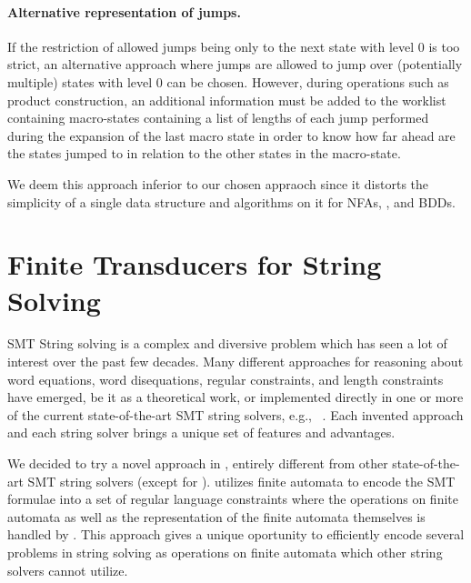 \paragraph{Alternative representation of jumps.}
If the restriction of allowed jumps being only to the next state with level $0$ is too strict, an alternative approach where jumps are allowed to jump over (potentially multiple) states with level $0$ can be chosen.
However, during operations such as product construction, an additional information must be added to the worklist containing macro-states containing a list of lengths of each jump performed during the expansion of the last macro state in order to know how far ahead are the states jumped to in relation to the other states in the macro-state.

We deem this approach inferior to our chosen appraoch since it distorts the simplicity of a single data structure and algorithms on it for NFAs, \nfts, and BDDs.


\section{Finite Transducers for String Solving}

SMT String solving is a complex and diversive problem which has seen a lot of interest over the past few decades.
Many different approaches for reasoning about word equations, word disequations, regular constraints, and length constraints have emerged, be it as a theoretical work, or implemented directly in one or more of the current state-of-the-art SMT string solvers, e.g., ~\cite{cvc4,cvc5,z3,Z3-str,Z3Str3,Z3str4,Trau,fm23_equations_synergy_regular_constraints_DBLP:conf/fm/BlahoudekCCHHLS23, tacas24_noodler_10.1007/978-3-031-57246-3_2, oopsla23_stabilization_DBLP:journals/pacmpl/ChenCHHLS23}.
Each invented approach and each string solver brings a unique set of features and advantages.

We decided to try a novel approach in \noodler, entirely different from other state-of-the-art SMT string solvers (except for \ostrich).
\noodler utilizes finite automata to encode the SMT formulae into a set of regular language constraints where the operations on finite automata as well as the representation of the finite automata themselves is handled by \mata.
This approach gives \noodler a unique oportunity to efficiently encode several problems in string solving as operations on finite automata which other string solvers cannot utilize.

